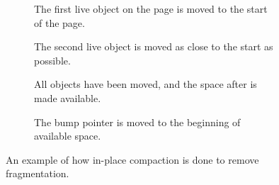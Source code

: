 \begin{figure}[H]
    \centering
    \begin{subfigure}[t]{.2\textwidth}
        \centering
        
        \caption{The first live object on the page is moved to the start of the page.}
        \label{fig:zrel_in1}
    \end{subfigure}
    \hfill\vline\hfill
    \begin{subfigure}[t]{.2\textwidth}
        \centering
        
        \caption{The second live object is moved as close to the start as possible.}
        \label{fig:zrel_in1}
    \end{subfigure}
    \hfill\vline\hfill
    \begin{subfigure}[t]{.2\textwidth}
        \centering
        
        \caption{All objects have been moved, and the space after is made available.}
        \label{fig:zrel_in1}
    \end{subfigure}
    \hfill\vline\hfill
    \begin{subfigure}[t]{.2\textwidth}
        \centering
        
        \caption{The bump pointer is moved to the beginning of available space.}
        \label{fig:zrel_in1}
    \end{subfigure}
    \caption{An example of how in-place compaction is done to remove fragmentation.}
    \label{fig:zrel_in}
\end{figure}
 
